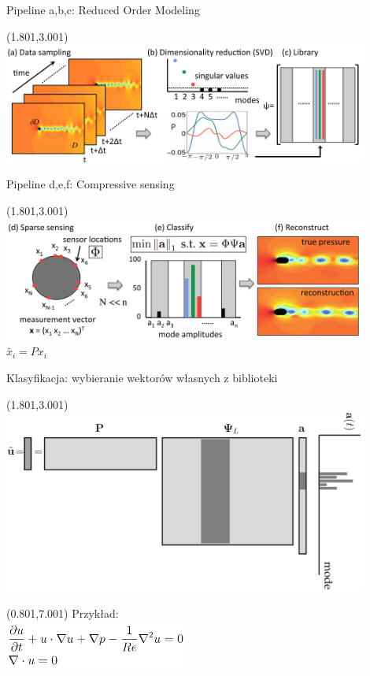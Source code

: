 \documentclass[aspectratio=169]{beamer}
\begin{document}
\begin{frame} {Pipeline a,b,c:  Reduced Order Modeling}
\begin{textblock}{13}(1.801,3.001)
	\includegraphics[width=12cm]{imgs/rom4.png}
\end{textblock}
\end{frame}

\begin{frame} {Pipeline d,e,f:  Compressive sensing}
\begin{textblock}{13}(1.801,3.001)
	\includegraphics[width=12cm]{imgs/rom5.png}
	$\tilde{x_i}=Px_i$
\end{textblock}
\end{frame}

\begin{frame} {Klasyfikacja: wybieranie wektorów własnych z biblioteki}
\begin{textblock}{13}(1.801,3.001)
	\includegraphics[width=12cm]{imgs/rom3.png}
\end{textblock}
\begin{textblock}{13}(0.801,7.001)
	Przykład:\\
\includegraphics[width=6cm]{imgs/pde.png}
\end{textblock}
\end{frame}
\end{document}
